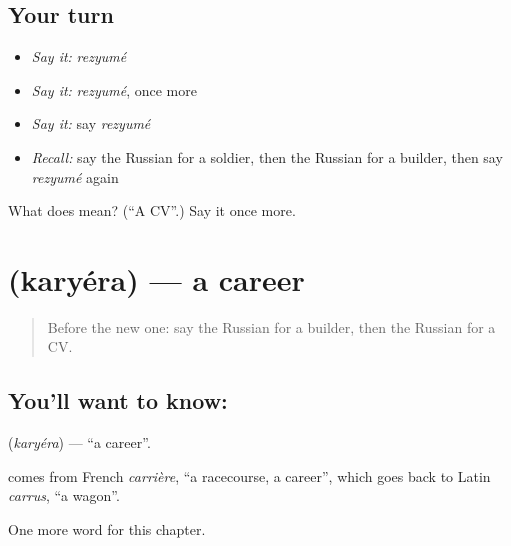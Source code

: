 \subsection*{Your turn}
\begin{itemize}
\raggedright
  \item \emph{Say it:} \emph{rezyumé}
  \item \emph{Say it:} \emph{rezyumé}, once more
  \item \emph{Say it:} say \emph{rezyumé}
  \item \emph{Recall:} say the Russian for a soldier, then the Russian for a builder, then say \emph{rezyumé} again
\end{itemize}

\begin{tcolorbox}[breakable,colback=teal!4,colframe=teal!35!black,title={Before you move on}]
What does  mean? (\textquotedblleft{}A CV\textquotedblright{}.) Say it once more.
\end{tcolorbox}
\section[\texorpdfstring{\ru{карьера} (karyéra)}{карьера (karyéra)}]{ (karyéra) — a career}

\label{lesson:RU-C172-karyera}



\begin{quote}
Before the new one: say the Russian for a builder, then the Russian for a CV.
\end{quote}

\subsection*{You'll want to know: }
\textbf{} (\emph{karyéra}) — \textquotedblleft{}a career\textquotedblright{}.

\begin{cousinweb}
\textbf{} comes from French \emph{carrière}, \textquotedblleft{}a racecourse, a career\textquotedblright{}, which goes back to Latin \emph{carrus}, \textquotedblleft{}a wagon\textquotedblright{}.
\end{cousinweb}

\begin{grammarlens}[title={What you've built}]
One more word for this chapter.
\end{grammarlens}

